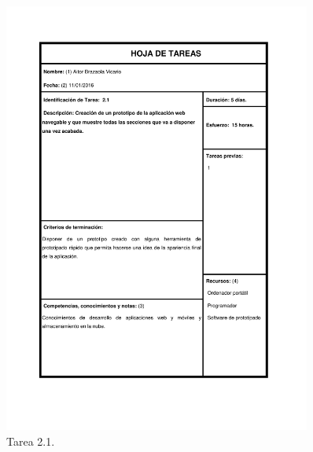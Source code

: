 \documentclass{DeustoFDP}
\begin{document}
\begin{figure}[H]
    \centering
    \includegraphics[width=0.9\textwidth]{fig/Tareas/21}
    \caption{Tarea 2.1.}
    \label{fig:t21}
\end{figure}
\end{document}
